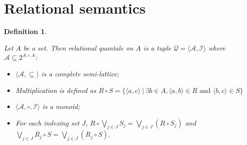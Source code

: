 \documentclass[a4paper]{article}
\theoremstyle{defin}
\newtheorem{defin}{Definition}
\theoremstyle{theorem}
\theoremstyle{prop}
\theoremstyle{lemma}
\theoremstyle{ex}
\theoremstyle{col}
\begin{document}
\begin{comment}
\begin{prooftree}
  \AxiomC{$f : \Gamma \otimes (F_s A \otimes B \otimes F_s A) \otimes \Delta \rightarrow C$}
  \UnaryInfC{$(id_{\Gamma} \otimes {c_A}_{s}^r \otimes id_{\Delta}) \circ f: \Gamma \otimes (B \otimes F_s A) \otimes \Delta \rightarrow C$}
\end{prooftree}

\begin{prooftree}
  \AxiomC{$f : \Gamma \otimes (\Delta \otimes F_s A) \otimes \Theta \rightarrow B$}
  \UnaryInfC{$(id_{\Gamma} \otimes (id_{\Delta} \otimes {e_A}_{s}) \otimes id_{\Theta}) \circ f: \Gamma \otimes (F_s A \otimes \Delta) \otimes \Theta \rightarrow B$}
\end{prooftree}

\begin{prooftree}
  \AxiomC{$f : \Gamma \otimes (F_s A \otimes \Delta) \otimes \Theta \rightarrow B$}
  \UnaryInfC{$(id_{\Gamma} \otimes (id_{\Delta} \otimes {e_A}_{s}^{-1}) \otimes id_{\Theta}) \circ f: \Gamma \otimes (\Delta \otimes F_s A) \otimes \Theta \rightarrow B$}
\end{prooftree}

    \item Completeness:

\begin{defin}
\end{defin}

  \end{itemize}
\end{proof}

\end{comment}

\section{Relational semantics}

\begin{defin}
  $ $

  Let $A$ be a set. Then relational quantale on $A$ is a tuple $\mathcal{Q} = \langle \mathcal{A}, \mathcal{I} \rangle$
  where $\mathcal{A} \subseteq 2^{A \times A}$:

  \begin{itemize}
    \item $\langle \mathcal{A}, \subseteq \rangle$ is a complete semi-lattice;
    \item Multiplication is defined as
      $R \circ S = \{ \langle a, c \rangle \: | \: \exists b \in A, \langle a, b \rangle \in R \text{ and } \langle b, c \rangle \in S\}$
    \item $\langle \mathcal{A}, \circ, \mathcal{I} \rangle$ is a monoid;
    \item For each indexing set $J$, $R \circ \bigvee_{j \in J} S_j = \bigvee_{j \in J} (R \circ S_j)$ and
      $\bigvee_{j \in J} R_j \circ S = \bigvee_{j \in J}(R_j \circ S)$.
  \end{itemize}
\end{defin}
\end{document}
